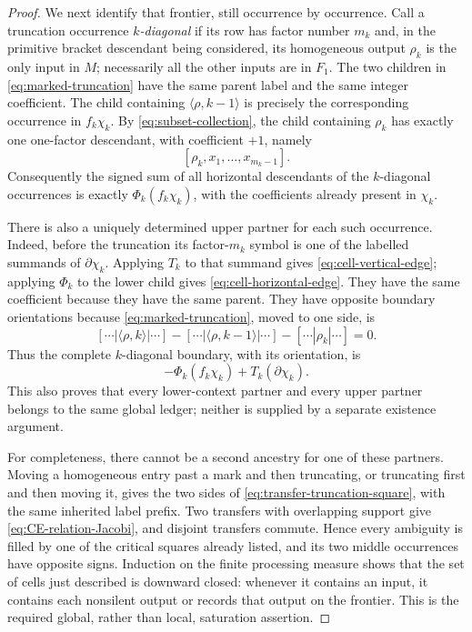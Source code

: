 \documentclass[11pt]{amsart}
\theoremstyle{remark}
\begin{document}
\begin{proof}
We next identify that frontier, still occurrence by occurrence.  Call a
truncation occurrence \emph{$k$-diagonal} if its row has factor number
$m_k$ and, in the primitive bracket descendant being considered, its
homogeneous output $\rho_k$ is the only input in $M$; necessarily all
the other inputs are in $F_1$.  The two children in
\eqref{eq:marked-truncation} have the same parent label and the same
integer coefficient.  The child containing
$\langle\rho,k-1\rangle$ is precisely the corresponding occurrence in
$f_k\chi_k$.  By \eqref{eq:subset-collection}, the child containing
$\rho_k$ has exactly one one-factor descendant, with coefficient $+1$,
namely
\[
                 [\rho_k,x_1,\ldots,x_{m_k-1}].
\]
Consequently the signed sum of all horizontal descendants of the
$k$-diagonal occurrences is exactly
$\Phi_k(f_k\chi_k)$, with the coefficients already present in
$\chi_k$.

There is also a uniquely determined upper partner for each such
occurrence.  Indeed, before the truncation its factor-$m_k$ symbol is
one of the labelled summands of $\partial\chi_k$.  Applying $T_k$ to
that summand gives \eqref{eq:cell-vertical-edge}; applying $\Phi_k$ to
the lower child gives \eqref{eq:cell-horizontal-edge}.  They have the
same coefficient because they have the same parent.  They have opposite
boundary orientations because
\eqref{eq:marked-truncation}, moved to one side, is
\[
 [\cdots|\langle\rho,k\rangle|\cdots]
 -[\cdots|\langle\rho,k-1\rangle|\cdots]
 -[\cdots|\rho_k|\cdots]=0.
\]
Thus the complete $k$-diagonal boundary, with its orientation, is
\begin{equation}\label{eq:labelled-diagonal-boundary}
             -\Phi_k(f_k\chi_k)+T_k(\partial\chi_k).
\end{equation}
This also proves that every lower-context partner and every upper
partner belongs to the same global ledger; neither is supplied by a
separate existence argument.

For completeness, there cannot be a second ancestry for one of these
partners.  Moving a homogeneous entry past a mark and then truncating,
or truncating first and then moving it, gives the two sides of
\eqref{eq:transfer-truncation-square}, with the same inherited label
prefix.  Two transfers with overlapping support give
\eqref{eq:CE-relation-Jacobi}, and disjoint transfers commute.  Hence
every ambiguity is filled by one of the critical squares already listed,
and its two middle occurrences have opposite signs.  Induction on the
finite processing measure shows that the set of cells just described is
downward closed: whenever it contains an input, it contains each
nonsilent output or records that output on the frontier.  This is the
required global, rather than local, saturation assertion.


\end{proof}
\end{document}

